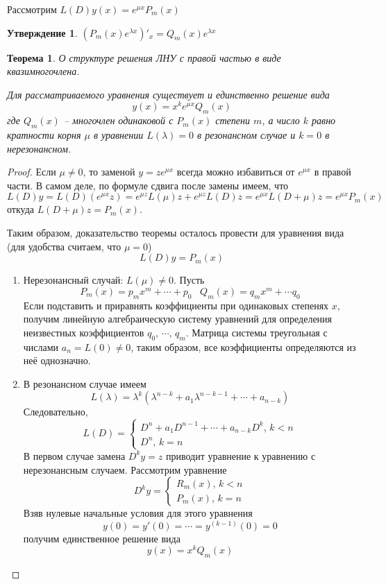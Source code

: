 \documentclass[a4paper,12pt]{article}
\theoremstyle{plain}
\newtheorem{theorem}{Теорема}[section]
\newtheorem{proposition}{Утверждение}[section]
\theoremstyle{definition}
\theoremstyle{remark}
\begin{document}
Рассмотрим $L(D)y(x) = e^{\mu x}P_m(x)$
\begin{proposition}
	$(P_m(x)e^{\lambda x})'_x = Q_m(x)e^{\lambda x}$
\end{proposition}

\begin{theorem}
	О структуре решения ЛНУ с правой частью в виде квазимногочлена.

	Для рассматриваемого уравнения существует и единственно решение вида
	\[y(x) = x^ke^{\mu x}Q_m(x)\]
	где $Q_m(x)$ -- многочлен одинаковой с $P_m(x)$ степени $m$, а число $k$ равно кратности корня $\mu$ в уравнении $L(\lambda) = 0$ в резонансном случае и $k = 0$ в нерезонансном.
\end{theorem}

\begin{proof}
	Если $\mu \neq 0$, то заменой $y = ze^{\mu x}$ всегда можно избавиться от $e^{\mu x}$ в правой части. В самом деле, по формуле сдвига после замены имеем, что
	\[L(D)y = L(D)(e^{\mu x}z) = e^{\mu z}L(\mu)z + e^{\mu z}L(D)z = e^{\mu x}L(D + \mu)z = e^{\mu x}P_m(x)\]
	откуда $L(D + \mu)z = P_m(x)$.

	Таким образом, доказательство теоремы осталось провести для уравнения вида (для удобства считаем, что $\mu = 0$)
	\[L(D)y = P_m(x)\]

	\begin{enumerate}
		\item Нерезонансный случай: $L(\mu) \neq 0$. Пусть
		      \[P_m(x) = p_mx^m + \cdots + p_0\;\;\; Q_m(x) = q_mx^m + \cdots q_0\]
		      Если подставить и приравнять коэффициенты при одинаковых степенях $x$, получим линейную алгебраическую систему уравнений для определения неизвестных коэффициентов $q_0,\,\cdots,\,q_m$. Матрица системы треугольная с числами $a_n = L(0) \neq 0$, таким образом, все коэффициенты определяются из неё однозначно.
		\item В резонансном случае имеем
		      \[
			      L(\lambda) = \lambda^k(\lambda^{n - k} + a_1\lambda^{n - k - 1} + \cdots + a_{n - k})
		      \]
		      Следовательно,
		      \[
			      L(D) = \begin{cases}
				      D^n + a_1D^{n-1} + \cdots + a_{n - k}D^k,\, k < n \\
				      D^n,\, k = n
			      \end{cases}
		      \]
		      В первом случае замена $D^ky = z$ приводит уравнение к уравнению с нерезонансным случаем. Рассмотрим уравнение
		      \[
			      D^ky = \begin{cases}
				      R_m(x),\, k < n \\
				      P_m(x),\, k = n
			      \end{cases}
		      \]
		      Взяв нулевые начальные условия для этого уравнения
		      \[
			      y(0) = y'(0) = \cdots = y^{(k - 1)}(0) = 0
		      \]
		      получим единственное решение вида
		      \[
			      y(x) = x^kQ_m(x)
		      \]
	\end{enumerate}
\end{proof}
\end{document}
